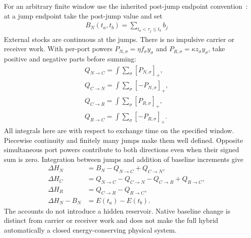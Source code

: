 For an arbitrary finite window use the inherited post-jump endpoint convention~\cite[Section 7]{rx}: at a jump endpoint take the post-jump value and set
\begin{equation}\label{eq:a13}%
\begin{gathered}
B_N(t_a,t_b)=\sum_{t_a<\tau_j\le t_b}b_j
\end{gathered}
\end{equation}
External stocks are continuous at the jumps. There is no impulsive carrier or receiver work. With per-port powers $P_{N,\sigma}=\eta f_\sigma y_\sigma$ and $P_{R,\sigma}=\kappa z_\sigma y_\sigma$, take positive and negative parts before summing:
\begin{equation}\label{eq:a14}%
\begin{gathered}
Q_{N\to C}=\int\sum_\sigma[P_{N,\sigma}]_+,\\ Q_{C\to N}=\int\sum_\sigma[-P_{N,\sigma}]_+,\\ Q_{C\to R}=\int\sum_\sigma[P_{R,\sigma}]_+,\\ Q_{R\to C}=\int\sum_\sigma[-P_{R,\sigma}]_+.
\end{gathered}
\end{equation}
All integrals here are with respect to exchange time on the specified window. Piecewise continuity and finitely many jumps make them well defined. Opposite simultaneous port powers contribute to both directions even when their signed sum is zero. Integration between jumps and addition of baseline increments give
\begin{equation}\label{eq:a15}%
\begin{aligned}
\Delta H_N&=B_N-Q_{N\to C}+Q_{C\to N},\\
\Delta H_C&=Q_{N\to C}-Q_{C\to N}-Q_{C\to R}+Q_{R\to C},\\
\Delta H_R&=Q_{C\to R}-Q_{R\to C},\\
\Delta H_N-B_N&=E(t_a)-E(t_b).
\end{aligned}
\end{equation}
The accounts do not introduce a hidden reservoir. Native baseline change is distinct from carrier or receiver work and does not make the full hybrid automatically a closed energy-conserving physical system.

